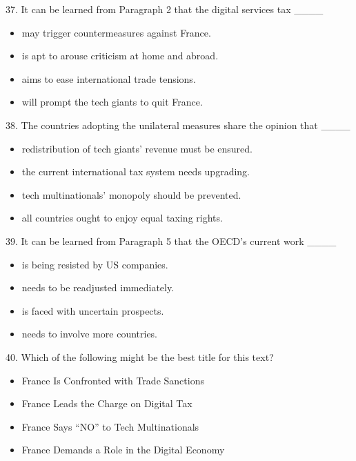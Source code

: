 \documentclass[UTF8,11pt]{ctexart}
\begin{document}
37. It can be learned from Paragraph 2 that the digital services tax \_\_\_\_


\begin{itemize}[leftmargin=2em,itemsep=.2em,topsep=.4em]\item[A.] may trigger countermeasures against France.
\item[B.] is apt to arouse criticism at home and abroad.
\item[C.] aims to ease international trade tensions.
\item[D.] will prompt the tech giants to quit France.
\end{itemize}

38. The countries adopting the unilateral measures share the opinion that \_\_\_\_


\begin{itemize}[leftmargin=2em,itemsep=.2em,topsep=.4em]\item[A.] redistribution of tech giants’ revenue must be ensured.
\item[B.] the current international tax system needs upgrading.
\item[C.] tech multinationals’ monopoly should be prevented.
\item[D.] all countries ought to enjoy equal taxing rights.
\end{itemize}

39. It can be learned from Paragraph 5 that the OECD’s current work \_\_\_\_


\begin{itemize}[leftmargin=2em,itemsep=.2em,topsep=.4em]\item[A.] is being resisted by US companies.
\item[B.] needs to be readjusted immediately.
\item[C.] is faced with uncertain prospects.
\item[D.] needs to involve more countries.
\end{itemize}

40. Which of the following might be the best title for this text?


\begin{itemize}[leftmargin=2em,itemsep=.2em,topsep=.4em]\item[A.] France Is Confronted with Trade Sanctions
\item[B.] France Leads the Charge on Digital Tax
\item[C.] France Says “NO” to Tech Multinationals
\item[D.] France Demands a Role in the Digital Economy
\end{itemize}
\end{document}
